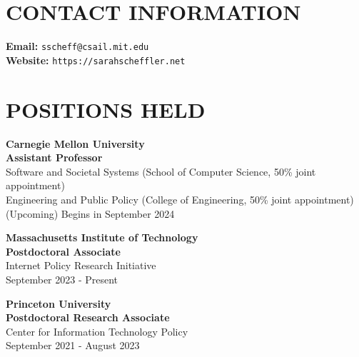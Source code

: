 \documentclass{res}
\begin{document}
 



                                  
\begin{resume}

\vspace{0.1in}

\section{CONTACT INFORMATION}  
\vspace{0.1in}
\textbf{Email:} \texttt{sscheff@csail.mit.edu} \\
\textbf{Website:} \texttt{https://sarahscheffler.net}


\section{POSITIONS HELD}  
\vspace{0.1in}

\textbf{Carnegie Mellon University} \\
\textbf{Assistant Professor} \\
Software and Societal Systems (School of Computer Science, 50\% joint appointment) \\
Engineering and Public Policy (College of Engineering, 50\% joint appointment) \\
(Upcoming) Begins in September 2024


\textbf{Massachusetts Institute of Technology} \\
\textbf{Postdoctoral Associate} \\
Internet Policy Research Initiative \\
September 2023 - Present

\textbf{Princeton University} \\
\textbf{Postdoctoral Research Associate} \\
Center for Information Technology Policy \\
September 2021 - August 2023


\end{resume}
\end{document}
